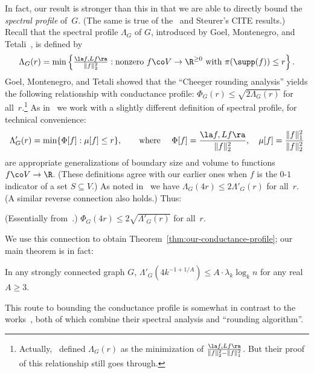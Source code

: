 \documentclass[11pt]{article}
\newcommand{\Bdry}{\Phi}
\begin{document}
{In fact, our result is stronger than this in that we are able to directly bound the \emph{spectral profile} of~$G$.  (The same is true of the~\cite{ABS10} and Steurer's CITE results.)  Recall that the spectral profile $\Lambda_G$ of $G$, introduced by Goel, Montenegro, and Tetali~\cite{GMT06}, is defined by
\[
    \Lambda_G(r) = \min \left\{ \tfrac{\la f, L f\ra}{\|f\|_2^2} : \text{nonzero } f \co V \to \R^{\geq 0} \text{ with } \pi(\supp(f)) \leq r\right\}.
\]
Goel, Montenegro, and Tetali showed that the ``Cheeger rounding analysis'' yields the following relationship with conductance profile: $\Phi_G(r) \leq \sqrt{2\Lambda_G(r)}$ for all~$r$.\footnote{Actually,~\cite{GMT06} defined $\Lambda_G(r)$ as the minimization of $\tfrac{\la f, L f\ra}{\|f\|_2^2 - \|f\|_1^2}$. But their proof of this relationship still goes through.} As in~\cite{ABS10} we work with a slightly different definition of spectral profile, for technical convenience:
\[
    \Lambda'_G(r) = \min \{ \Bdry[f] : \mu[f] \leq r \}, \qquad \text{where } \quad
    \Bdry[f] = \frac{\la f, L f\ra}{\|f\|_2^2}, \quad \mu[f] = \frac{\|f\|_1^2}{\|f\|_2^2}
\]
are appropriate generalizations of boundary size and volume to functions $f \co V \to \R$.  (These definitions agree with our earlier ones when $f$ is the $0$-$1$ indicator of a set $S \subseteq V$.)  As noted in~\cite[Lemma~A.2]{ABS10} we have $\Lambda_G(4r) \leq 2 \Lambda'_G(r)$ for all~$r$.  (A similar reverse connection also holds.)  Thus:
\begin{theorem} \label{thm:GMT} (Essentially from~\cite{GMT06}.) $\Phi_G(4r) \leq 2\sqrt{\Lambda'_G(r)}$ for all~$r$.
\end{theorem}

We use this connection to obtain Theorem~\ref{thm:our-conductance-profile}; our main theorem is in fact:
\begin{theorem} \label{thm:our-spectral-profile}
    In any strongly connected graph $G$, $\Lambda'_G(4 k^{-1+1/A}) \leq A \cdot \lambda_k \log_k n$ for any real $A \geq 3$.
\end{theorem}
This route to bounding the conductance profile is somewhat in contrast to the works~\cite{LRTV12,LOT12}, both of which combine their spectral analysis and ``rounding algorithm''.\\

}
\end{document}
